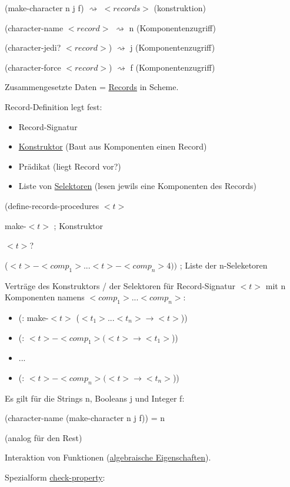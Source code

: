 \documentclass[a4paper, 20pt, openany]{book}
\begin{document}
(make-character n j f) $\rightsquigarrow$ $<records>$ (konstruktion)

(character-name $<record>$ $\rightsquigarrow$ n (Komponentenzugriff)

(character-jedi? $<record>$) $\rightsquigarrow$ j (Komponentenzugriff)

(character-force $<record>$) $\rightsquigarrow$ f (Komponentenzugriff)

Zusammengesetzte Daten = \underline{Records} in Scheme.

Record-Definition legt fest:

\begin{itemize}
  \item Record-Signatur
  \item \underline{Konstruktor} (Baut aus Komponenten einen Record)
  \item Prädikat (liegt Record vor?)
  \item Liste von \underline{Selektoren} (lesen jewils eine Komponenten des Records)
\end{itemize}

\begin{center}
(define-records-procedures $<t>$

make-$<t>$ ; Konstruktor

$<t>$?

($<t>-<comp_1> ...<t>-<comp_n>4))$ ; Liste der n-Seleketoren
\end{center}

Verträge des Konstruktors / der Selektoren für Record-Signatur $<t>$ mit n Komponenten namens $<comp_1> ... <comp_n>$:

\begin{itemize}
  \item (: make-$<t>$ ($<t_1>...<t_n> \rightarrow <t>$))
  \item (: $<t>-<comp_1> (<t> \rightarrow <t_1>$))
  \item ...
  \item (: $<t>-<comp_n> (<t> \rightarrow <t_n>$))
\end{itemize}

Es gilt für die Strings n, Booleans j und Integer f:

(character-name (make-character n j f)) = n 

(analog für den Rest)

Interaktion von Funktionen (\underline{algebraische Eigenschaften}).

Spezialform \underline{check-property}:
\end{document}
